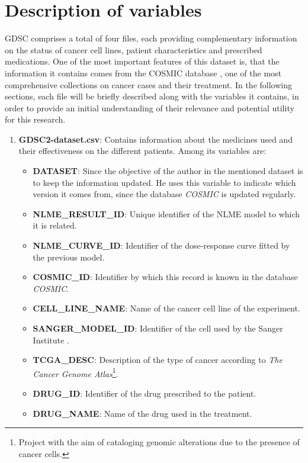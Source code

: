 \section{Description of variables}
GDSC comprises a total of four files, each providing complementary information on the status of cancer cell lines, patient characteristics and prescribed medications. One of the most important features of this dataset is, that the information it contains comes from the COSMIC database \cite{cosmic}, one of the most comprehensive collections on cancer cases and their treatment. In the following sections, each file will be briefly described along with the variables it contains, in order to provide an initial understanding of their relevance and potential utility for this research.

\begin{enumerate}
    \item \textbf{GDSC2-dataset.csv}: Contains information about the medicines used and their effectiveness on the different patients. Among its variables are:
    \begin{itemize}
        \item \textbf{DATASET}: Since the objective of the author in the mentioned dataset is to keep the information updated. He uses this variable to indicate which version it comes from, since the database \textit{COSMIC} is updated regularly.
        \item \textbf{NLME\_RESULT\_ID}: Unique identifier of the NLME model to which it is related.
        \item \textbf{NLME\_CURVE\_ID}: Identifier of the dose-response curve fitted by the previous model.
        \item \textbf{COSMIC\_ID}: Identifier by which this record is known in the database \textit{COSMIC}.
        \item \textbf{CELL\_LINE\_NAME}: Name of the cancer cell line of the experiment.
        \item \textbf{SANGER\_MODEL\_ID}: Identifier of the cell used by the Sanger Institute \cite{sanger}.
        \item \textbf{TCGA\_DESC}: Description of the type of cancer according to \textit{The Cancer Genome Atlas}\footnote{Project with the aim of cataloging genomic alterations due to the presence of cancer cells.}.
        \item \textbf{DRUG\_ID}: Identifier of the drug prescribed to the patient.
        \item \textbf{DRUG\_NAME}: Name of the drug used in the treatment.

\end{itemize}
\end{enumerate}
